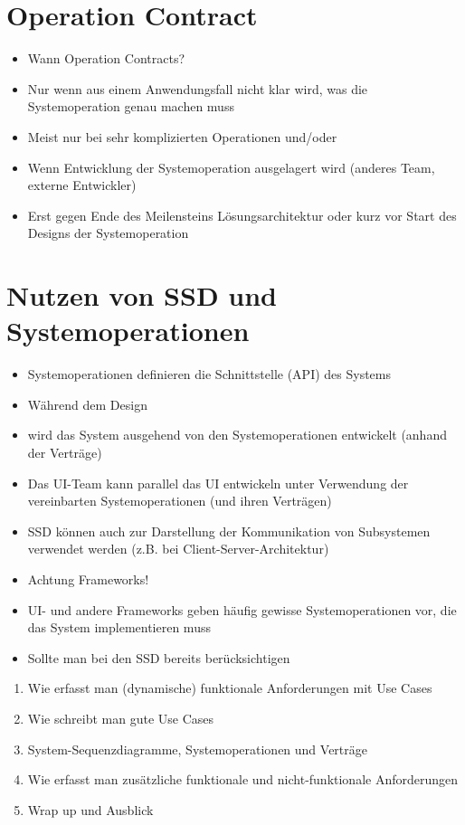 \documentclass[10pt]{article}
\begin{document}
\section*{Operation Contract}
\begin{itemize}
  \item Wann Operation Contracts?
  \item Nur wenn aus einem Anwendungsfall nicht klar wird, was die Systemoperation genau machen muss
  \item Meist nur bei sehr komplizierten Operationen und/oder
  \item Wenn Entwicklung der Systemoperation ausgelagert wird (anderes Team, externe Entwickler)
  \item Erst gegen Ende des Meilensteins Lösungsarchitektur oder kurz vor Start des Designs der Systemoperation
\end{itemize}

\section*{Nutzen von SSD und Systemoperationen}
\begin{itemize}
  \item Systemoperationen definieren die Schnittstelle (API) des Systems
  \item Während dem Design
  \item wird das System ausgehend von den Systemoperationen entwickelt (anhand der Verträge)
  \item Das UI-Team kann parallel das UI entwickeln unter Verwendung der vereinbarten Systemoperationen (und ihren Verträgen)
  \item SSD können auch zur Darstellung der Kommunikation von Subsystemen verwendet werden (z.B. bei Client-Server-Architektur)
  \item Achtung Frameworks!
  \item UI- und andere Frameworks geben häufig gewisse Systemoperationen vor, die das System implementieren muss
  \item Sollte man bei den SSD bereits berücksichtigen
\end{itemize}

\begin{enumerate}
  \item Wie erfasst man (dynamische) funktionale Anforderungen mit Use Cases
  \item Wie schreibt man gute Use Cases
  \item System-Sequenzdiagramme, Systemoperationen und Verträge
  \item Wie erfasst man zusätzliche funktionale und nicht-funktionale Anforderungen
  \item Wrap up und Ausblick
\end{enumerate}
\end{document}
